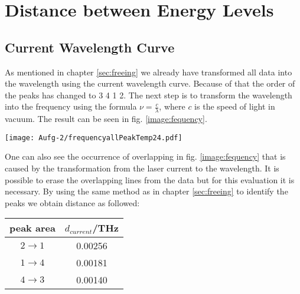 \section{Distance between Energy Levels}
\label{sec:distance}
\subsection*{Current Wavelength Curve}
As mentioned in chapter \ref{sec:freeing} we already have transformed all data into the wavelength using the current wavelength curve. Because of that the order of the peaks has changed to 3 4 1 2. The next step is to transform the wavelength into the frequency using the formula $\nu=\frac{c}{\lambda}$, where $c$ is the speed of light in vacuum. The result can be seen in fig. \ref{image:fequency}.
\begin{center}
    \texttt{[image: Aufg-2/frequencyallPeakTemp24.pdf]}
    \label{image:fequency}
\end{center}
One can also see the occurrence of overlapping in fig. \ref{image:fequency} that is caused by the transformation from the laser current to the wavelength. It is possible to erase the overlapping lines from the data but for this evaluation it is necessary.
By using the same method as in chapter \ref{sec:freeing} to identify the peaks we obtain distance as followed:
\begin{center}
    \begin{tabular}{c | c}
        peak area & $d_{current}$/THz\\
        \hline
        $2 \rightarrow 1$ & 0.00256\\
        $1 \rightarrow 4$ & 0.00181\\
        $4 \rightarrow 3$ & 0.00140\\
    \end{tabular}
    \label{tab:currentMethode}
\end{center}
